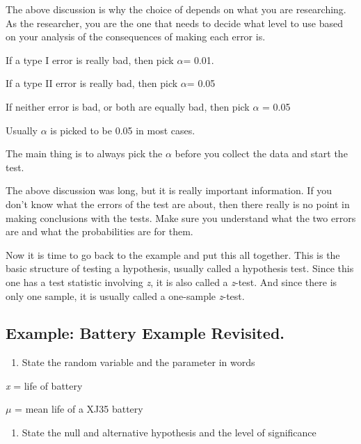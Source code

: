 \documentclass[
]{book}
\providecommand{\tightlist}{%
  \setlength{\itemsep}{0pt}\setlength{\parskip}{0pt}}
\begin{document}
The above discussion is why the choice of depends on what you are researching. As the researcher, you are the one that needs to decide what level to use based on your analysis of the consequences of making each error is.

If a type I error is really bad, then pick \(\alpha\)= 0.01.

If a type II error is really bad, then pick \(\alpha\)= 0.05

If neither error is bad, or both are equally bad, then pick \(\alpha\) = 0.05

Usually \(\alpha\) is picked to be 0.05 in most cases.

The main thing is to always pick the \(\alpha\) before you collect the data and start the test.

The above discussion was long, but it is really important information. If you don't know what the errors of the test are about, then there really is no point in making conclusions with the tests. Make sure you understand what the two errors are and what the probabilities are for them.

Now it is time to go back to the example and put this all together. This is the basic structure of testing a hypothesis, usually called a hypothesis test. Since this one has a test statistic involving \emph{z}, it is also called a \emph{z}-test. And since there is only one sample, it is usually called a one-sample \emph{z}-test.

\hypertarget{example-battery-example-revisited.}{%
\subsection{Example: Battery Example Revisited.}\label{example-battery-example-revisited.}}

\begin{enumerate}
\def\labelenumi{\arabic{enumi}.}
\tightlist
\item
  State the random variable and the parameter in words
\end{enumerate}

\emph{x} = life of battery

\(\mu\) = mean life of a XJ35 battery

\begin{enumerate}
\def\labelenumi{\arabic{enumi}.}
\setcounter{enumi}{1}
\tightlist
\item
  State the null and alternative hypothesis and the level of significance
\end{enumerate}
\end{document}
